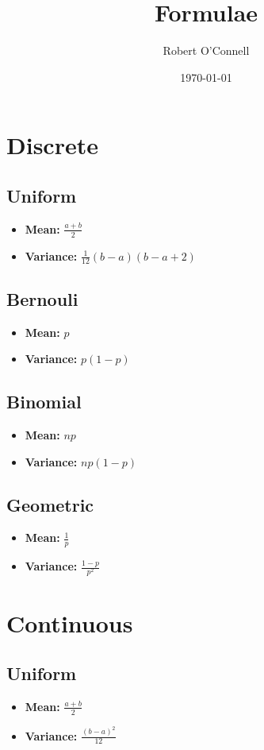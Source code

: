 \documentclass{article}
\title{\textbf{Formulae}}
\author{Robert O'Connell}
\date{\today}
\begin{document}
\maketitle
\vspace{5mm}
\section*{Discrete}

\subsection*{Uniform}
\begin{itemize}
    \item \textbf{Mean:} \(\frac{a+b}{2}\)
    \item \textbf{Variance:} \(\frac{1}{12}(b-a)(b-a+2)\)
\end{itemize}
\subsection*{Bernouli}
\begin{itemize}
    \item \textbf{Mean:} \(p\)
    \item \textbf{Variance:} \(p(1-p)\)
\end{itemize}
\subsection*{Binomial}
\begin{itemize}
    \item \textbf{Mean:} \(np\) 
    \item \textbf{Variance:} \(np(1-p)\)
\end{itemize}
\subsection*{Geometric}
\begin{itemize}
    \item \textbf{Mean:} \(\frac{1}{p}\)
    \item \textbf{Variance:} \(\frac{1-p}{p^2}\)
\end{itemize}



\section*{Continuous}
\subsection*{Uniform}
\begin{itemize}
    \item \textbf{Mean:} \(\frac{a+b}{2}\)
    \item \textbf{Variance:} \(\frac{(b-a)^2}{12}\)
\end{itemize}
\end{document}
